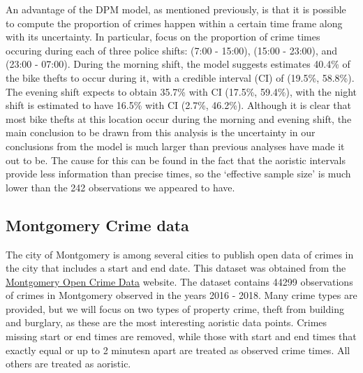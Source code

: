 An advantage of the DPM model, as mentioned previously, is that it is possible to compute the proportion of crimes happen within a certain time frame along with its uncertainty. In particular, \citet{ashby2013comparison} focus on the proportion of crime times occuring during each of three police shifts: (7:00 - 15:00), (15:00 - 23:00), and (23:00 - 07:00). During the morning shift, the model suggests estimates 40.4\% of the bike thefts to occur during it, with a credible interval (CI) of (19.5\%,  58.8\%). The evening shift expects to obtain 35.7\% with CI (17.5\%, 59.4\%), with the night shift is estimated to have 16.5\% with CI (2.7\%, 46.2\%). Although it is clear that most bike thefts at this location occur during the morning and evening shift, the main conclusion to be drawn from this analysis is the uncertainty in our conclusions from the model is much larger than previous analyses have made it out to be. The cause for this can be found in the fact that the aoristic intervals provide less information than precise times, so the `effective sample size' is much lower than the 242 observations we appeared to have.






























\subsection{Montgomery Crime data}

The city of Montgomery is among several cities to publish open data of crimes in the city that includes a start and end date. This dataset was obtained from the \href{https://data.montgomerycountymd.gov/Public-Safety/Crime/icn6-v9z3}{Montgomery Open Crime Data} website. The dataset contains 44299 observations of crimes in Montgomery observed in the years 2016 - 2018. Many crime types are provided, but we will focus on two types of property crime, theft from building and burglary, as these are the most interesting aoristic data points. Crimes missing start or end times are removed, while those with start and end times that exactly equal or up to 2 minutesn apart are treated as observed crime times. All others are treated as aoristic.

